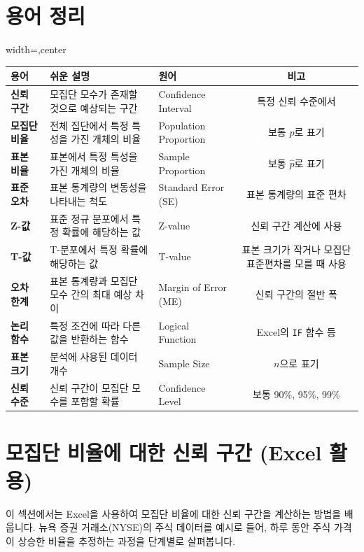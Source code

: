 \documentclass[11pt,a4paper]{book}
\newcommand{\excel}[1]{\texttt{#1}}
\theoremstyle{definition}
\begin{document}
\section{용어 정리}

\begin{adjustbox}{width=\textwidth,center}
\begin{tabular}{lllc}
\toprule
\textbf{용어} & \textbf{쉬운 설명} & \textbf{원어} & \textbf{비고} \\
\midrule
\textbf{신뢰 구간} & 모집단 모수가 존재할 것으로 예상되는 구간 & Confidence Interval & 특정 신뢰 수준에서 \\
\textbf{모집단 비율} & 전체 집단에서 특정 특성을 가진 개체의 비율 & Population Proportion & 보통 $p$로 표기 \\
\textbf{표본 비율} & 표본에서 특정 특성을 가진 개체의 비율 & Sample Proportion & 보통 $\hat{p}$로 표기 \\
\textbf{표준 오차} & 표본 통계량의 변동성을 나타내는 척도 & Standard Error (SE) & 표본 통계량의 표준 편차 \\
\textbf{Z-값} & 표준 정규 분포에서 특정 확률에 해당하는 값 & Z-value & 신뢰 구간 계산에 사용 \\
\textbf{T-값} & T-분포에서 특정 확률에 해당하는 값 & T-value & 표본 크기가 작거나 모집단 표준편차를 모를 때 사용 \\
\textbf{오차 한계} & 표본 통계량과 모집단 모수 간의 최대 예상 차이 & Margin of Error (ME) & 신뢰 구간의 절반 폭 \\
\textbf{논리 함수} & 특정 조건에 따라 다른 값을 반환하는 함수 & Logical Function & Excel의 \excel{IF} 함수 등 \\
\textbf{표본 크기} & 분석에 사용된 데이터 개수 & Sample Size & $n$으로 표기 \\
\textbf{신뢰 수준} & 신뢰 구간이 모집단 모수를 포함할 확률 & Confidence Level & 보통 90\%, 95\%, 99\% \\
\bottomrule
\end{tabular}
\end{adjustbox}


\section{모집단 비율에 대한 신뢰 구간 (Excel 활용)}
이 섹션에서는 Excel을 사용하여 모집단 비율에 대한 신뢰 구간을 계산하는 방법을 배웁니다. 뉴욕 증권 거래소(NYSE)의 주식 데이터를 예시로 들어, 하루 동안 주식 가격이 상승한 비율을 추정하는 과정을 단계별로 살펴봅니다.
\end{document}
